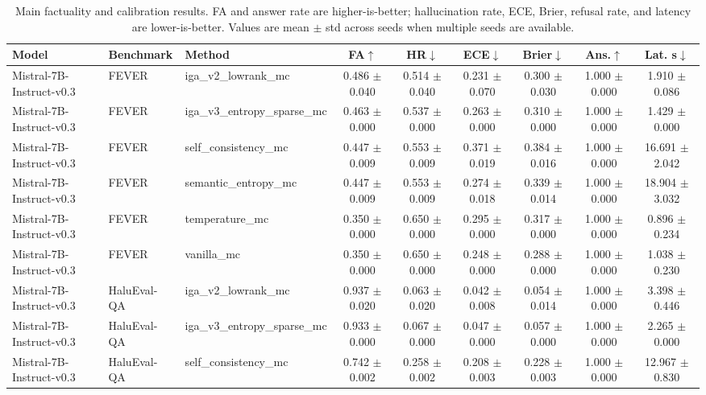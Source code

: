 \begin{table}[t]
\centering
\caption{Main factuality and calibration results. FA and answer rate are higher-is-better; hallucination rate, ECE, Brier, refusal rate, and latency are lower-is-better. Values are mean $\pm$ std across seeds when multiple seeds are available.}
\label{tab:main_results}
\small
\begin{tabular}{lllcccccc}
\toprule
Model & Benchmark & Method & FA$\uparrow$ & HR$\downarrow$ & ECE$\downarrow$ & Brier$\downarrow$ & Ans.$\uparrow$ & Lat. s$\downarrow$ \\
\midrule
Mistral-7B-Instruct-v0.3 & FEVER & iga\_v2\_lowrank\_mc & 0.486 $\pm$ 0.040 & 0.514 $\pm$ 0.040 & 0.231 $\pm$ 0.070 & 0.300 $\pm$ 0.030 & 1.000 $\pm$ 0.000 & 1.910 $\pm$ 0.086 \\
Mistral-7B-Instruct-v0.3 & FEVER & iga\_v3\_entropy\_sparse\_mc & 0.463 $\pm$ 0.000 & 0.537 $\pm$ 0.000 & 0.263 $\pm$ 0.000 & 0.310 $\pm$ 0.000 & 1.000 $\pm$ 0.000 & 1.429 $\pm$ 0.000 \\
Mistral-7B-Instruct-v0.3 & FEVER & self\_consistency\_mc & 0.447 $\pm$ 0.009 & 0.553 $\pm$ 0.009 & 0.371 $\pm$ 0.019 & 0.384 $\pm$ 0.016 & 1.000 $\pm$ 0.000 & 16.691 $\pm$ 2.042 \\
Mistral-7B-Instruct-v0.3 & FEVER & semantic\_entropy\_mc & 0.447 $\pm$ 0.009 & 0.553 $\pm$ 0.009 & 0.274 $\pm$ 0.018 & 0.339 $\pm$ 0.014 & 1.000 $\pm$ 0.000 & 18.904 $\pm$ 3.032 \\
Mistral-7B-Instruct-v0.3 & FEVER & temperature\_mc & 0.350 $\pm$ 0.000 & 0.650 $\pm$ 0.000 & 0.295 $\pm$ 0.000 & 0.317 $\pm$ 0.000 & 1.000 $\pm$ 0.000 & 0.896 $\pm$ 0.234 \\
Mistral-7B-Instruct-v0.3 & FEVER & vanilla\_mc & 0.350 $\pm$ 0.000 & 0.650 $\pm$ 0.000 & 0.248 $\pm$ 0.000 & 0.288 $\pm$ 0.000 & 1.000 $\pm$ 0.000 & 1.038 $\pm$ 0.230 \\
Mistral-7B-Instruct-v0.3 & HaluEval-QA & iga\_v2\_lowrank\_mc & 0.937 $\pm$ 0.020 & 0.063 $\pm$ 0.020 & 0.042 $\pm$ 0.008 & 0.054 $\pm$ 0.014 & 1.000 $\pm$ 0.000 & 3.398 $\pm$ 0.446 \\
Mistral-7B-Instruct-v0.3 & HaluEval-QA & iga\_v3\_entropy\_sparse\_mc & 0.933 $\pm$ 0.000 & 0.067 $\pm$ 0.000 & 0.047 $\pm$ 0.000 & 0.057 $\pm$ 0.000 & 1.000 $\pm$ 0.000 & 2.265 $\pm$ 0.000 \\
Mistral-7B-Instruct-v0.3 & HaluEval-QA & self\_consistency\_mc & 0.742 $\pm$ 0.002 & 0.258 $\pm$ 0.002 & 0.208 $\pm$ 0.003 & 0.228 $\pm$ 0.003 & 1.000 $\pm$ 0.000 & 12.967 $\pm$ 0.830 \\

\end{tabular}
\end{table}
